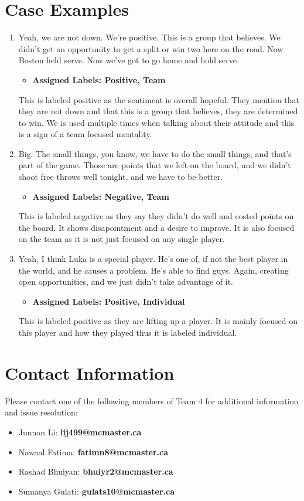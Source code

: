 \documentclass[titlepage]{article}
\begin{document}
\section{Case Examples}
\begin{enumerate}
    \item Yeah, we are not down. We're positive. This is a group that believes. We didn't get an 
    opportunity to get a split or win two here on the road. Now Boston held serve. Now we've 
    got to go home and hold serve.
    \begin{itemize}
        \item \textbf{Assigned Labels: Positive, Team}
    \end{itemize}
    This is labeled positive as the sentiment is overall hopeful. They mention that they are not 
    down and that this is a group that believes, they are determined to win. We is used multiple 
    times when talking about their attitude and this is a sign of a team focused mentality.

    \item Big. The small things, you know, we have to do the small things, and that's part of 
    the game. Those are points that we left on the board, and we didn't shoot free throws well 
    tonight, and we have to be better.
    \begin{itemize}
        \item \textbf{Assigned Labels: Negative, Team}
    \end{itemize}
    This is labeled negative as they say they didn't do well and costed points on the board. 
    It shows disapointment and a desire to improve. It is also focused on the team as it is not 
    just focused on any single player.

    \item Yeah, I think Luka is a special player. He's one of, if not the best player in the 
    world, and he causes a problem. He's able to find guys. Again, creating open opportunities, 
    and we just didn't take advantage of it.
    \begin{itemize}
        \item \textbf{Assigned Labels: Positive, Individual}
    \end{itemize}
    This is labeled positive as they are lifting up a player. It is mainly focused on this 
    player and how they played thus it is labeled individual.
\end{enumerate}

\section{Contact Information}
Please contact one of the following members of Team 4 for additional information and issue resolution:
\begin{itemize}
    \item Junnan Li: \textbf{lij499@mcmaster.ca}
    \item Nawaal Fatima: \textbf{fatimn8@mcmaster.ca}
    \item Rashad Bhuiyan: \textbf{bhuiyr2@mcmaster.ca}
    \item Sumanya Gulati: \textbf{gulats10@mcmaster.ca}
\end{itemize}
\end{document}
